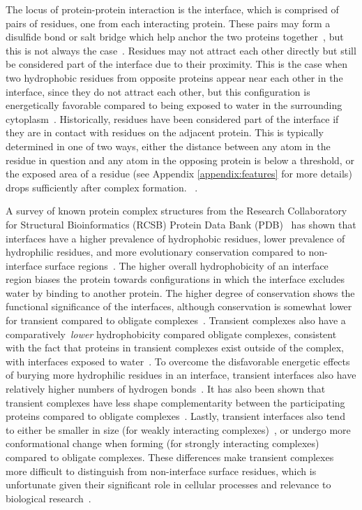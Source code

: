The locus of protein-protein interaction is the interface, which is comprised of pairs of residues, one from each interacting protein.
These pairs may form a disulfide bond or salt bridge which help anchor the two proteins together~\cite{yan2008}, but this is not always the case~\cite{ofran2003}.
Residues may not attract each other directly but still be considered part of the interface due to their proximity.
This is the case when two hydrophobic residues from opposite proteins appear near each other in the interface, since they do not attract each other, but this configuration is energetically favorable compared to being exposed to water in the surrounding cytoplasm~\cite{yan2008, ofran2003}.
Historically, residues have been considered part of the interface if they are in contact with residues on the adjacent protein. 
This is typically determined in one of two ways, either the distance between any atom in the residue in question and any atom in the opposing protein is below a threshold, or the exposed area of a residue (see Appendix \ref{appendix:features} for more details) drops sufficiently after complex formation. ~\cite{yan2008, jones1996, ofran2003, minhas2014}.

A survey of known protein complex structures from the Research Collaboratory for Structural Bioinformatics (RCSB) Protein Data Bank (PDB)~\cite{berman2000} has shown that interfaces have a higher prevalence of hydrophobic residues, lower prevalence of hydrophilic residues, and more evolutionary conservation compared to non-interface surface regions~\cite{yan2008}.
The higher overall hydrophobicity of an interface region biases the protein towards configurations in which the interface excludes water by binding to another protein.
The higher degree of conservation shows the functional significance of the interfaces, although conservation is somewhat lower for transient compared to obligate complexes~\cite{jones1996}.
Transient complexes also have a comparatively~\textit{lower} hydrophobicity compared obligate complexes, consistent with the fact that proteins in transient complexes exist outside of the complex, with interfaces exposed to water~\cite{jones1996}.
To overcome the disfavorable energetic effects of burying more hydrophilic residues in an interface, transient interfaces also have relatively higher numbers of hydrogen bonds~\cite{jones1996}.
It has also been shown that transient complexes have less shape complementarity between the participating proteins compared to obligate complexes~\cite{jones1996}.
Lastly, transient interfaces also tend to either be smaller in size (for weakly interacting complexes)~\cite{jones1996, perkins2010}, or undergo more conformational change when forming (for strongly interacting complexes)~\cite{perkins2010} compared to obligate complexes.
These differences make transient complexes more difficult to distinguish from non-interface surface residues, which is unfortunate given their significant role in cellular processes and relevance to biological research~\cite{perkins2010}.

